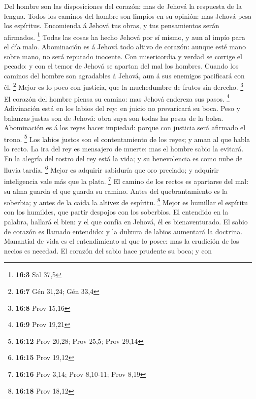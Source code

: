  Del hombre son las disposiciones del corazón: mas de Jehová
la respuesta de la lengua.  Todos los caminos del hombre son
limpios en su opinión: mas Jehová pesa los espíritus. 
Encomienda á Jehová tus obras, y tus pensamientos serán afirmados.
\footnote{\textbf{16:3} Sal 37,5}  Todas las cosas ha hecho
Jehová por sí mismo, y aun al impío para el día malo. 
Abominación es á Jehová todo altivo de corazón: aunque esté mano sobre
mano, no será reputado inocente.  Con misericordia y verdad
se corrige el pecado: y con el temor de Jehová se apartan del mal los
hombres.  Cuando los caminos del hombre son agradables á
Jehová, aun á sus enemigos pacificará con él. \footnote{\textbf{16:7}
  Gén 31,24; Gén 33,4}  Mejor es lo poco con justicia, que
la muchedumbre de frutos sin derecho. \footnote{\textbf{16:8} Prov 15,16}
 El corazón del hombre piensa su camino: mas Jehová endereza
sus pasos. \footnote{\textbf{16:9} Prov 19,21}  Adivinación
está en los labios del rey: en juicio no prevaricará su boca.
 Peso y balanzas justas son de Jehová: obra suya son todas
las pesas de la bolsa.  Abominación es á los reyes hacer
impiedad: porque con justicia será afirmado el trono. \footnote{\textbf{16:12}
  Prov 20,28; Prov 25,5; Prov 29,14}  Los labios justos son
el contentamiento de los reyes; y aman al que habla lo recto.
 La ira del rey es mensajero de muerte: mas el hombre sabio
la evitará.  En la alegría del rostro del rey está la vida;
y su benevolencia es como nube de lluvia tardía. \footnote{\textbf{16:15}
  Prov 19,12}  Mejor es adquirir sabiduría que oro
preciado; y adquirir inteligencia vale más que la plata. \footnote{\textbf{16:16}
  Prov 3,14; Prov 8,10-11; Prov 8,19}  El camino de los
rectos es apartarse del mal: su alma guarda el que guarda su camino.
 Antes del quebrantamiento es la soberbia; y antes de la
caída la altivez de espíritu. \footnote{\textbf{16:18} Prov 18,12}
 Mejor es humillar el espíritu con los humildes, que partir
despojos con los soberbios.  El entendido en la palabra,
hallará el bien: y el que confía en Jehová, él es bienaventurado.
 El sabio de corazón es llamado entendido: y la dulzura de
labios aumentará la doctrina.  Manantial de vida es el
entendimiento al que lo posee: mas la erudición de los necios es
necedad.  El corazón del sabio hace prudente su boca; y con
